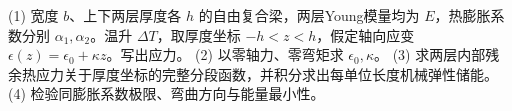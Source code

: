 (1) 宽度 \(b\)、上下两层厚度各 \(h\) 的自由复合梁，两层Young模量均为 \(E\)，热膨胀系数分别 \(\alpha_1,\alpha_2\)。温升 \(\Delta T\)，取厚度坐标 \(-h<z<h\)，假定轴向应变 \(\epsilon(z)=\epsilon_0+\kappa z\)。写出应力。
(2) 以零轴力、零弯矩求 \(\epsilon_0,\kappa\)。
(3) 求两层内部残余热应力关于厚度坐标的完整分段函数，并积分求出每单位长度机械弹性储能。
(4) 检验同膨胀系数极限、弯曲方向与能量最小性。
